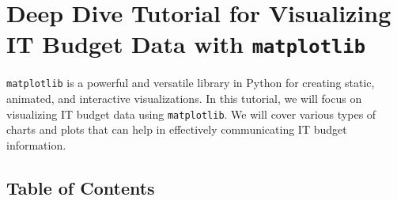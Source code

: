 \documentclass[
  letterpaper,
  DIV=11,
  numbers=noendperiod]{scrreprt}
\begin{document}

\chapter{\texorpdfstring{Deep Dive Tutorial for Visualizing IT Budget
Data with
\texttt{matplotlib}}{Deep Dive Tutorial for Visualizing IT Budget Data with matplotlib}}\label{deep-dive-tutorial-for-visualizing-it-budget-data-with-matplotlib}

\texttt{matplotlib} is a powerful and versatile library in Python for
creating static, animated, and interactive visualizations. In this
tutorial, we will focus on visualizing IT budget data using
\texttt{matplotlib}. We will cover various types of charts and plots
that can help in effectively communicating IT budget information.

\section{Table of Contents}\label{table-of-contents-23}
\end{document}
